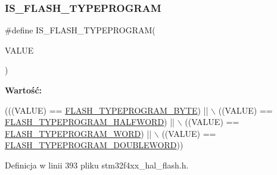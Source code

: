 \subsubsection{\texorpdfstring{I\+S\+\_\+\+F\+L\+A\+S\+H\+\_\+\+T\+Y\+P\+E\+P\+R\+O\+G\+R\+AM}{IS\_FLASH\_TYPEPROGRAM}}
{\footnotesize\ttfamily \#define I\+S\+\_\+\+F\+L\+A\+S\+H\+\_\+\+T\+Y\+P\+E\+P\+R\+O\+G\+R\+AM(\begin{DoxyParamCaption}\item[{}]{V\+A\+L\+UE }\end{DoxyParamCaption})}

{\bfseries Wartość\+:}
\begin{DoxyCode}
(((VALUE) == \hyperlink{group___f_l_a_s_h___type___program_gac975d7139325057ed0069c6b55e4faed}{FLASH\_TYPEPROGRAM\_BYTE}) || \(\backslash\)
                                    ((VALUE) == \hyperlink{group___f_l_a_s_h___type___program_ga2b607dfc2efd463a8530e327bc755582}{FLASH\_TYPEPROGRAM\_HALFWORD}) || \(\backslash\)
                                    ((VALUE) == \hyperlink{group___f_l_a_s_h___type___program_gadd25c6821539030ba6711e7c0d586c3e}{FLASH\_TYPEPROGRAM\_WORD}) || \(\backslash\)
                                    ((VALUE) == \hyperlink{group___f_l_a_s_h___type___program_gabdc2b0b4d2e66c2be90fafbfbf1e225f}{FLASH\_TYPEPROGRAM\_DOUBLEWORD}))
\end{DoxyCode}


Definicja w linii 393 pliku stm32f4xx\+\_\+hal\+\_\+flash.\+h.

